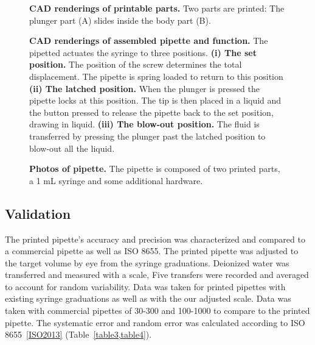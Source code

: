 \documentclass[10pt,letterpaper]{article}
\begin{document}
\begin{figure}
\caption{
{\bf CAD renderings of printable parts.} Two parts are printed: The plunger part (A) slides inside the body part (B).
}
\label{fig1}
\end{figure}

\begin{figure}
\caption{
{\bf CAD renderings of assembled pipette and function.} The pipetted actuates the syringe to three positions. {\bf(i) The set position.} The position of the screw determines the total displacement. The pipette is spring loaded to return to this position {\bf (ii) The latched position.} When the plunger is pressed the pipette locks at this position. The tip is then placed in a liquid and the button pressed to release the pipette back to the set position, drawing in liquid. {\bf (iii) The blow-out position.} The fluid is transferred by pressing the plunger past the latched position to blow-out all the liquid.  
}
\label{fig2}
\end{figure}

\begin{figure}
\caption{
{\bf Photos of pipette.}  The pipette is composed of two printed parts, a 1 mL syringe and some additional hardware.  
}
\label{fig3}
\end{figure}

\subsection*{Validation}
The printed pipette’s accuracy and precision was characterized and compared to a commercial pipette as well as ISO 8655.
The printed pipette was adjusted to the target volume by eye from the syringe graduations.
Deionized water was transferred and measured with a scale,
Five transfers were recorded and averaged to account for random variability.
Data was taken for printed pipettes with existing syringe graduations as well as with the our adjusted scale.
Data was taken with commercial pipettes of 30-300 and 100-1000 to compare to the printed pipette. 
The systematic error and random error was calculated according to ISO 8655~\ref{ISO2013} (Table~\ref{table3,table4}).
\end{document}
